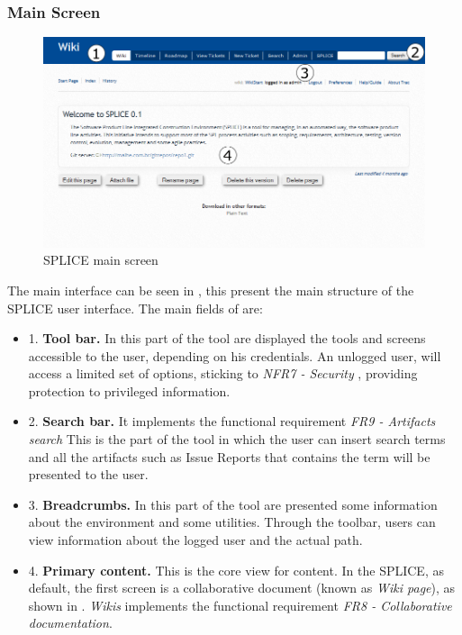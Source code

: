 \subsubsection{Main Screen}
\begin{figure}[htp]
\begin{center}
  \includegraphics[width=16cm]{chapters/proposed_solution/img/captures/main.PNG}
  \caption[SPLICE main screen]{SPLICE main screen}
  \label{fg:splice-main-screen}
\end{center}
\end{figure}
The main interface can be seen in , this present the main structure of the \ac{SPLICE} user interface. The main fields of are:
\begin{itemize}
\item  1. \textbf{ Tool bar.} In this part of the tool are displayed the tools and screens accessible to the user, depending on his credentials. An unlogged user, will access a limited set of options, sticking to \textit{NFR7 - Security} , providing protection to privileged information.

\item  2. \textbf{ Search bar.} It implements the functional requirement \textit{FR9 - Artifacts search}  This is the part of the tool in which the user can insert search terms and all the artifacts such as Issue Reports that contains the term will be presented to the user.
\item  3.\textbf{ Breadcrumbs.}
In this part of the tool are presented some information about the environment and some utilities. Through the toolbar, users can view information about the logged user and the actual path.
\item  4.\textbf{ Primary content.} This is the core view for content. In the \ac{SPLICE}, as default, the first screen is a collaborative document (known as \textit{Wiki page}), as shown in . \textit{Wikis} implements the functional requirement \textit{FR8 - Collaborative documentation}.
\end{itemize}


